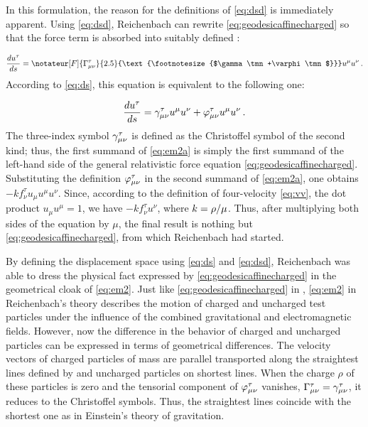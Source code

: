 \documentclass[submitted]{article}
\newcommand{\texts}[1]{\text{\footnotesize{#1}}}
\newcommand{\ctmrd}{\ensuremath{\hfrac{\rho}{\mu}}\xspace}
\begin{document}
In this formulation, the reason for the definitions of \cref{eq:dsd} is immediately apparent. Using \cref{eq:dsd}, Reichenbach can rewrite \eqref{eq:geodesicaffinecharged} so that the force term is absorbed into suitably defined \Gtmn:

\begin{equation}
\label{eq:em2} 
\frac{du^\tau}{ds} =\notateur[F]{\Gamma^{\tau}_{\mu\nu}}{2.5}{\texts{$\gamma\tmn+\varphi\tmn$}}u^\mu u^\nu\,.
\end{equation}
%
According to \cref{eq:ds}, this equation is equivalent to the following one:

\begin{equation}
\label{eq:em2a} 
\frac{du^\tau}{ds}=\gamma^{\tau}_{\mu\nu}u^\mu u^\nu+\varphi^{\tau}_{\mu\nu}u^\mu u^\nu\,.
\end{equation}
%
The three-index symbol $\gamma^\tau_{\mu\nu}$ is defined as the Christoffel symbol of the second kind; thus, the first summand of \cref{eq:em2a} is simply the first summand of the left-hand side of the general relativistic force equation \cref{eq:geodesicaffinecharged}. Substituting the definition $\varphi^\tau_{\mu\nu}$ in the second summand of \cref{eq:em2a}, one obtains $- k f_\nu^{\tau} u_\mu u^\mu u^\nu$. Since, according to the definition of four-velocity \cref{eq:vv}, the dot product $u_\mu u^\mu=1$, we have $- k f_\nu^{\tau} u^\nu$, where $k=\ctmrd$. Thus, after multiplying both sides of the equation by $\mu$, the final result is nothing but \cref{eq:geodesicaffinecharged}, from which Reichenbach had started.

By defining the displacement space \Gtmn using \cref{eq:ds} and \cref{eq:dsd}, Reichenbach was able to dress the physical fact expressed by \cref{eq:geodesicaffinecharged} in the geometrical cloak of \cref{eq:em2}. Just like \cref{eq:geodesicaffinecharged} in \gr, \cref{eq:em2} in Reichenbach's theory describes the motion of charged and uncharged test particles under the influence of the combined gravitational and electromagnetic fields. However, now the difference in the behavior of charged and uncharged particles can be expressed in terms of geometrical differences. The velocity vectors of charged particles of mass are parallel transported along the straightest lines defined by \Gtmn and uncharged particles on shortest lines. When the charge $\rho$ of these particles is zero and the tensorial component of $\varphi^\tau_{\mu\nu}$ vanishes, $\Gamma^\tau_{\mu\nu}=\gamma^\tau_{\mu\nu}$, \ie it reduces to the Christoffel symbols. Thus, the straightest lines coincide with the shortest one as in Einstein's theory of gravitation.
\end{document}
